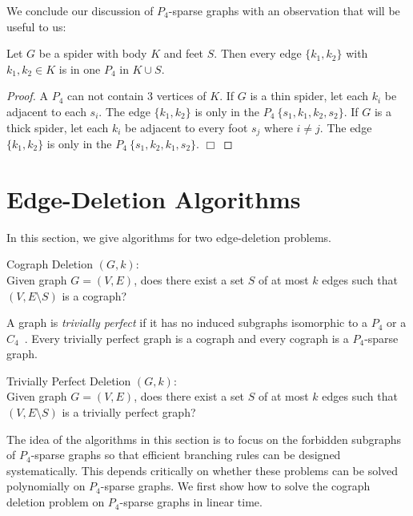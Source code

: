 \documentclass{llncs}
\begin{document}
We conclude our discussion of $P_4$-sparse graphs with an observation that will be useful to us:

\begin{lemma}\label{lem:unique}
  Let $G$ be a spider with body $K$ and feet $S$. Then every edge $\{k_1,k_2\}$ with $k_1, k_2 \in K$ is in one $P_4$ in $K\cup S$. 
\end{lemma}

\begin{proof}
  A $P_4$ can not contain 3 vertices of $K$. If $G$ is a thin spider, let each $k_i$ be adjacent to each $s_i$. The edge $\{k_1,k_2\}$ is only in the $P_4 \ \{s_1,k_1,k_2,s_2\}$. If $G$ is a thick spider, let each $k_i$ be adjacent to every foot $s_j$ where $i\neq j$. The edge $\{k_1,k_2\}$ is only in the $P_4 \ \{s_1,k_2,k_1,s_2\}$.
 \hfill $\Box$
\end{proof}

\section{Edge-Deletion Algorithms}

In this section, we give algorithms for two edge-deletion problems.

\begin{problem}{\sc Cograph Deletion} $(G, k)$:\\
Given graph $G=(V,E)$, does there exist a set $S$ of at most $k$ edges such that $(V,E\setminus S)$ is a cograph?
\end{problem}

A graph is \emph{trivially perfect} if it has no induced subgraphs isomorphic to a $P_4$ or a $C_4$~\cite{YCC}. Every trivially perfect graph is a cograph and every cograph is a $P_4$-sparse graph.

\begin{problem}{\sc Trivially Perfect Deletion} $(G, k)$:\\
Given graph $G=(V,E)$, does there exist a set $S$ of at most $k$ edges such that $(V,E\setminus S)$ is a trivially perfect graph?
\end{problem}

The idea of the algorithms in this section is to focus on the forbidden subgraphs of $P_4$-sparse graphs so that efficient branching rules can be designed systematically. This depends critically on whether these problems can be solved polynomially on $P_4$-sparse graphs. We first show how to solve the cograph deletion problem on $P_4$-sparse graphs in linear time.
\end{document}
